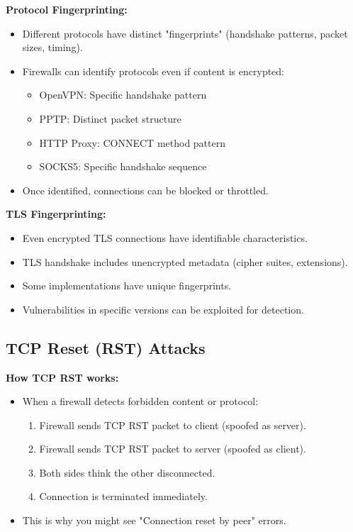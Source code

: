 \textbf{Protocol Fingerprinting:}
\begin{itemize}
    \item Different protocols have distinct "fingerprints" (handshake patterns, packet sizes, timing).
    \item Firewalls can identify protocols even if content is encrypted:
    \begin{itemize}
        \item OpenVPN: Specific handshake pattern
        \item PPTP: Distinct packet structure
        \item HTTP Proxy: CONNECT method pattern
        \item SOCKS5: Specific handshake sequence
    \end{itemize}
    \item Once identified, connections can be blocked or throttled.
\end{itemize}

\textbf{TLS Fingerprinting:}
\begin{itemize}
    \item Even encrypted TLS connections have identifiable characteristics.
    \item TLS handshake includes unencrypted metadata (cipher suites, extensions).
    \item Some implementations have unique fingerprints.
    \item Vulnerabilities in specific versions can be exploited for detection.
\end{itemize}

\subsection{TCP Reset (RST) Attacks}

\textbf{How TCP RST works:}
\begin{itemize}
    \item When a firewall detects forbidden content or protocol:
    \begin{enumerate}
        \item Firewall sends TCP RST packet to client (spoofed as server).
        \item Firewall sends TCP RST packet to server (spoofed as client).
        \item Both sides think the other disconnected.
        \item Connection is terminated immediately.
    \end{enumerate}
    \item This is why you might see "Connection reset by peer" errors.
\end{itemize}

